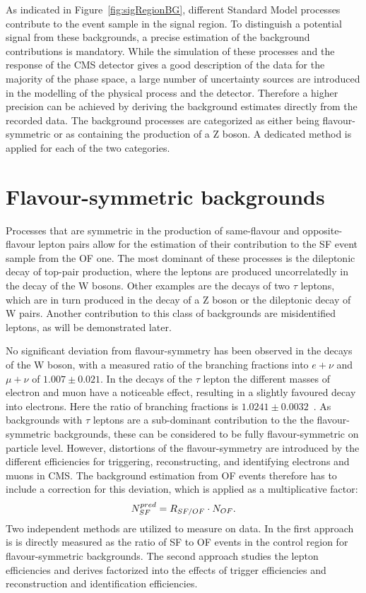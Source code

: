 As indicated in Figure~\ref{fig:sigRegionBG}, different Standard Model processes contribute to the event sample in the signal region. To distinguish a potential signal from these backgrounds, a precise estimation of the background contributions is mandatory. While the simulation of these processes and the response of the CMS detector gives a good description of the data for the majority of the phase space, a large number of uncertainty sources are introduced in the modelling of the physical process and the detector. Therefore a higher precision can be achieved by deriving the background estimates directly from the recorded data. The background processes are categorized as either being flavour-symmetric or as containing the production of a Z boson. A dedicated method is applied for each of the two categories. 
\section{Flavour-symmetric backgrounds}
Processes that are symmetric in the production of same-flavour and opposite-flavour lepton pairs allow for the estimation of their contribution to the SF event sample from the OF one. The most dominant of these processes is the dileptonic decay of top-pair production, where the leptons are produced uncorrelatedly in the decay of the W bosons. Other examples are the decays of two $\tau$ leptons, which are in turn produced in the decay of a Z boson or the dileptonic decay of W pairs. Another contribution to this class of backgrounds are misidentified leptons, as will be demonstrated later. 

No significant deviation from flavour-symmetry has been observed in the decays of the W boson, with a measured ratio of the branching fractions into $e+\nu$ and $\mu + \nu$ of $1.007\pm0.021$. In the decays of the $\tau$ lepton the different masses of electron and muon have a noticeable effect, resulting in a slightly favoured decay into electrons. Here the ratio of branching fractions is $1.0241\pm0.0032$~\cite{PDG}. As backgrounds with $\tau$ leptons are a sub-dominant contribution to the the flavour-symmetric backgrounds, these can be considered to be fully flavour-symmetric on particle level. However, distortions of the flavour-symmetry are introduced by the different efficiencies for triggering, reconstructing, and identifying electrons and muons in CMS. The background estimation from OF events therefore has to include a correction for this deviation, which is applied as a multiplicative factor:
\begin{equation}
N_{SF}^{pred} = R_{SF/OF} \cdot N_{OF}.
\end{equation}
Two independent methods are utilized to measure \Rsfof on data. In the first approach is is directly measured as the ratio of SF to OF events in the control region for flavour-symmetric backgrounds. The second approach studies the lepton efficiencies and derives \Rsfof factorized into the effects of trigger efficiencies and reconstruction and identification efficiencies.  


